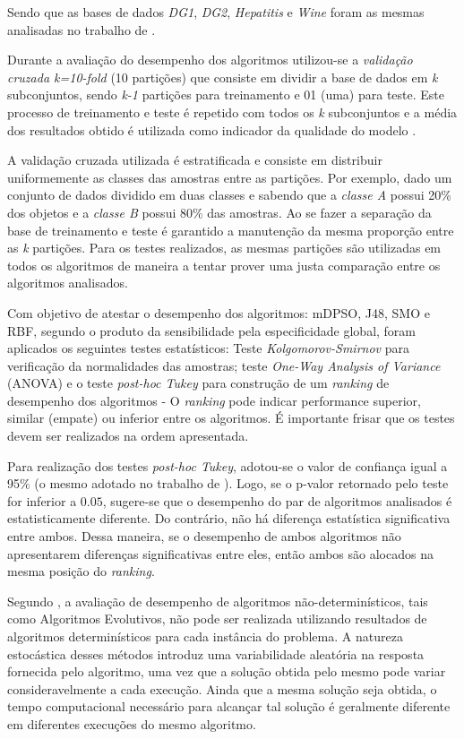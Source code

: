 \documentclass[
	12pt,				%
	openany,			%
	oneside,	
	a4paper,			%
	brazil,				%
	]{unimontes-ppgmsc-abntex2}
\begin{document}
Sendo que as bases de dados {\em DG1}, {\em DG2}, {\em Hepatitis} e {\em Wine} foram as mesmas analisadas no trabalho de .

Durante a avaliação do desempenho dos algoritmos utilizou-se a {\em validação cruzada k=10-fold} (10 partições) que consiste em dividir a base de dados em {\em k} subconjuntos, sendo {\em k-1} partições para treinamento e 01 (uma) para teste. Este processo de treinamento e teste é repetido com todos os {\em k} subconjuntos e a média dos resultados obtido é utilizada como indicador da qualidade do modelo \cite{Castro_2016}.

A validação cruzada utilizada é estratificada e consiste em distribuir uniformemente as classes das amostras entre as partições. Por exemplo, dado um conjunto de dados dividido em duas classes e sabendo que a {\em classe A} possui 20\% dos objetos e a {\em classe B} possui 80\% das amostras. Ao se fazer a separação da base de treinamento e teste é garantido a manutenção da mesma proporção entre as {\em k} partições. Para os testes realizados, as mesmas partições são utilizadas em todos os algoritmos de maneira a tentar prover uma justa comparação entre os algoritmos analisados. 

Com objetivo de atestar o desempenho dos algoritmos: mDPSO, J48, SMO e RBF, segundo o produto da sensibilidade pela especificidade global, foram aplicados os seguintes testes estatísticos: Teste {\em Kolgomorov-Smirnov} para verificação da normalidades das amostras; teste {\em One-Way Analysis of Variance} (ANOVA) e o teste {\em post-hoc Tukey} para construção de um {\em ranking} de desempenho dos algoritmos - O {\em ranking} pode indicar performance superior, similar (empate) ou inferior entre os algoritmos. É importante frisar que os testes devem ser realizados na ordem apresentada.

Para realização dos testes  {\em post-hoc Tukey}, adotou-se o valor de confiança igual a 95\% (o mesmo adotado no trabalho de ). Logo, se o p-valor retornado pelo teste for inferior a $0.05$, sugere-se que o desempenho do par de algoritmos analisados é estatisticamente diferente. Do contrário, não há diferença estatística significativa entre ambos. Dessa maneira, se o desempenho de ambos algoritmos não apresentarem diferenças significativas entre eles, então ambos são alocados na mesma posição do {\em ranking}. 

Segundo , a avaliação de desempenho de algoritmos não-determinísticos, tais como Algoritmos Evolutivos, não pode ser realizada utilizando resultados de algoritmos determinísticos para cada instância do problema. A natureza estocástica desses métodos introduz uma variabilidade aleatória na resposta fornecida pelo algoritmo, uma vez que a solução obtida pelo mesmo pode variar consideravelmente a cada execução. Ainda que a mesma solução seja obtida, o tempo computacional necessário para alcançar tal solução é geralmente diferente em diferentes execuções do mesmo algoritmo.
\end{document}
